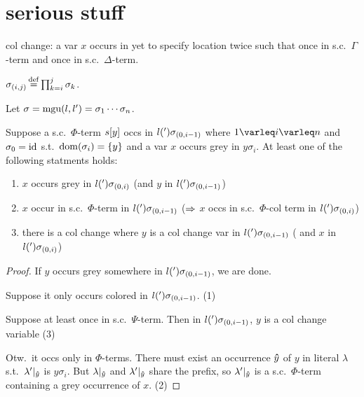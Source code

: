 \documentclass[,%
	paper=a4,%
	DIV11, %
	twoside=false,%
	liststotoc,
	bibtotoc,
	draft=false,%
	numbers=noendperiod
]{scrartcl}
\begin{document}
\clearpage

\section{serious stuff}


\begin{defi}
	col change: a var $x$ occurs in yet to specify location twice such that once in s.c.\ $\Gamma$-term and once in s.c.\ $\Delta$-term.
\end{defi}

\newcommand{\epsilondelta}{\varepsilon\occ\delta}
\newcommand{\epsilonx}{\varepsilon\occ x}
\newcommand{\epsilony}{\varepsilon\occ y}
\newcommand{\epsilonz}{\varepsilon\occ z}


\begin{defi}
	$\sigma_{(i,j)} \operatorname{\stackrel{\mathrm{def}}{=}} \prod_{k=i}^j\sigma_k$.
\end{defi}

\begin{lemma}
	\label{new_25}
	Let $\sigma = \operatorname{mgu}(l, l') = \sigma_1 \cdots \sigma_n$.

	Suppose a s.c.\ $\Phi$-term $s[y]$ occs in $l(')\sigma_{(0,i-1)}$ where $1\varleq i \varleq n$ and $\sigma_0 = \operatorname{id}$ s.t.\ $\operatorname{dom}(\sigma_i) = \{y\}$ and a var $x$ occurs grey in $y\sigma_i$.
	At least one of the following statments holds:

	\begin{enumerate}
		\item $x$ occurs grey in $l(')\sigma_{(0,i)}$ (and $y$ in $l(')\sigma_{(0,i-1)}$)
		\item $x$ occur in s.c.\ $\Phi$-term in $l(')\sigma_{(0,i-1)}$  
			($\Rightarrow$ $x$ occs in s.c.\ $\Phi$-col term in $l(')\sigma_{(0,i)}$)
		\item there is a col change where $y$ is a col change var in $l(')\sigma_{(0,i-1)}$ ( and $x$ in $l(')\sigma_{(0,i)}$) 
	\end{enumerate}
\end{lemma}
\begin{proof}
	If $y$ occurs grey somewhere in $l(')\sigma_{(0,i-1)}$, we are done.

	Suppose it only occurs colored in $l(')\sigma_{(0,i-1)}$. (1)

	Suppose at least once in s.c.\ $\Psi$-term.
	Then in $l(')\sigma_{(0,i-1)}$, $y$ is a col change variable (3)

	Otw.\ it occs only in $\Phi$-terms. 
	There must exist an occurrence $\bm\hat y$ of $y$ in literal $\lambda$ s.t.\ $\lambda'|_{\bm\hat y}$ is $y\sigma_i$.
But $\lambda|_{\bm\hat y}$ and $\lambda'|_{\bm\hat y}$ share the prefix, so $\lambda'|_{\bm\hat y}$ is a s.c.\ $\Phi$-term containing a grey occurrence of $x$. (2)
\end{proof}
\end{document}
